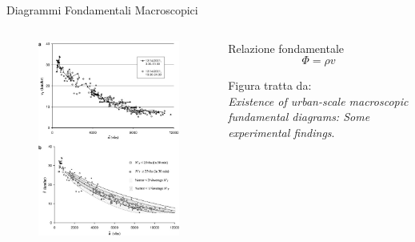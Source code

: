 \documentclass[
	11pt, %
]{beamer}
\begin{document}
\begin{frame}{Diagrammi Fondamentali Macroscopici}
	\begin{columns}[c]
		\begin{column}{.6\textwidth}
			\begin{figure}
				\includegraphics[width=.83\linewidth]{daganzo2.jpg}
			\end{figure}
		\end{column}
		\begin{column}{.4\textwidth}
			\begin{block}{Relazione fondamentale}
				\begin{equation*}
					\Phi=\rho v
				\end{equation*}
			\end{block}
			\vspace{10mm}
			Figura tratta da: \\ \emph{Existence of urban-scale macroscopic fundamental
			diagrams: Some experimental findings}.
		\end{column}	
	\end{columns}
\end{frame}
\end{document}
